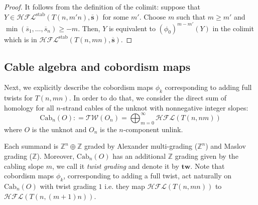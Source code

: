 \documentclass{amsart}
\newcommand{\Cab}{\mathrm{Cab}}
\newcommand{\Tw}{\mathcal{TW}}
\newcommand{\cHFL}{\mathcal{H\!F\! L}}
\newcommand{\ovl}{\overline}
\newcommand{\tw}{\mathbf{tw}}
\newcommand{\Z}{\mathbb{Z}}
\newcommand{\stab}{\mathrm{stab}}
\renewcommand{\ss}{\mathbf{s}}
\begin{document}
\begin{proof}
It follows from the definition of the colimit: suppose that $Y\in \cHFL^{\stab}(T(n,m'n),\ovl{\ss})$ for some $m'$. Choose $m$ such that $m\ge m'$ and $\min(\overline{s}_1,\ldots,\overline{s}_n)\ge -m$. Then, $Y$ is equivalent to $\left(\phi_0\right)^{m-m'}(Y)$ in the colimit which is in $\cHFL^{\stab}(T(n,mn),\ovl{\ss})$. 
\end{proof}

\subsection{Cable algebra and cobordism maps} Next, we explicitly describe the cobordism maps $\phi_k$ corresponding to adding full twists  for $T(n,mn)$. In order to do that, we consider the direct sum of homology for all $n$-strand cables of the unknot with nonnegative integer slopes:
\begin{equation}\label{eq:CabU}
\Cab_n(O): =\Tw(O_n)=\bigoplus_{m=0}^{\infty}\cHFL(T(n,nm))
\end{equation}
where $O$ is the unknot and  $O_n$ is the $n$-component unlink. 

Each summand is $\Z^n\oplus \Z$ graded by Alexander multi-grading ($\Z^n$) and Maslov grading ($\Z$). Moreover, $\Cab_n(O)$ has an additional $\Z$ grading given by the cabling slope $m$, we call it \emph{twist grading} and denote it by $\tw$. Note that cobordism maps $\phi_k$, corresponding to adding a full twist, act naturally on $\Cab_n(O)$ with twist grading $1$ i.e. they map $\cHFL(T(n,mn))$ to $\cHFL(T(n,(m+1)n))$. 
\end{document}
